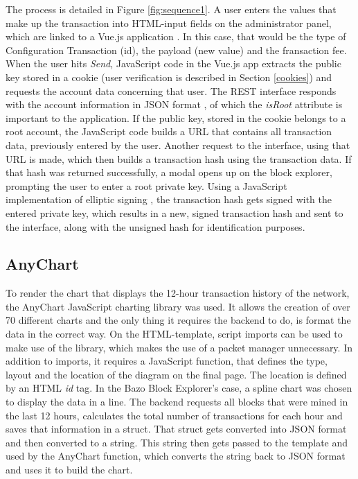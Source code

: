 The process is detailed in Figure \ref{fig:sequence1}. A user enters the values that make up the transaction into HTML-input fields on the administrator panel, which are linked to a Vue.js application \cite{vue} . In this case, that would be the type of Configuration Transaction (id), the payload (new value) and the fransaction fee. When the user hits \emph{Send}, JavaScript code in the Vue.js app extracts the public key stored in a cookie \cite{vcookies} (user verification is described in Section \ref{cookies}) and requests the account data concerning that user. The REST interface responds with the account information in JSON format \cite{json}, of which the \emph{isRoot} attribute is important to the application. If the public key, stored in the cookie belongs to a root account, the JavaScript code builds a URL that contains all transaction data, previously entered by the user. Another request to the interface, using that URL is made, which then builds a transaction hash using the transaction data. If that hash was returned successfully, a modal opens up on the block explorer, prompting the user to enter a root private key. Using a JavaScript implementation of elliptic signing \cite{elliptic}, the transaction hash gets signed with the entered private key, which results in a new, signed transaction hash and sent to the interface, along with the unsigned hash for identification purposes.

\subsection{AnyChart} \label{chart}
To render the chart that displays the 12-hour transaction history of the network, the AnyChart JavaScript charting library \cite{anychart} was used. It allows the creation of over 70 different charts and the only thing it requires the backend to do, is format the data in the correct way. On the HTML-template, script imports can be used to make use of the library, which makes the use of a packet manager unnecessary. In addition to imports, it requires a JavaScript function, that defines the type, layout and the location of the diagram on the final page. The location is defined by an HTML \emph{id} tag. In the Bazo Block Explorer's case, a spline chart was chosen to display the data in a line.
The backend requests all blocks that were mined in the last 12 hours, calculates the total number of transactions for each hour and saves that information in a struct. That struct gets converted into JSON format and then converted to a string. This string then gets passed to the template and used by the AnyChart function, which converts the string back to JSON format and uses it to build the chart.

